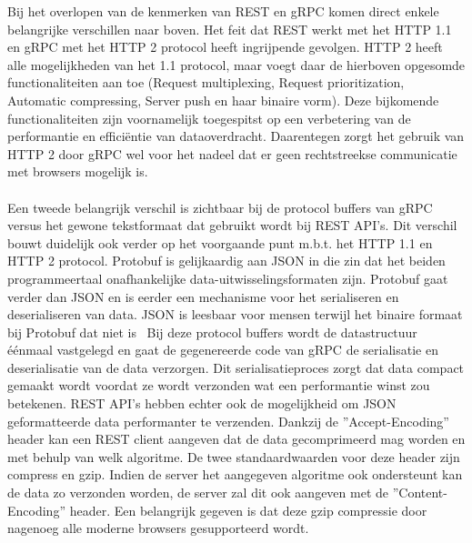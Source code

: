 Bij het overlopen van de kenmerken van REST en gRPC komen direct enkele belangrijke verschillen naar boven.
Het feit dat REST werkt met het HTTP 1.1 en gRPC met het HTTP 2 protocol heeft ingrijpende gevolgen. HTTP 2 heeft alle mogelijkheden van het 1.1 protocol,
maar voegt daar de hierboven opgesomde functionaliteiten aan toe (Request multiplexing, Request prioritization, Automatic compressing,
Server push en haar binaire vorm). Deze bijkomende functionaliteiten zijn voornamelijk toegespitst op een verbetering van de performantie en effici\"entie van dataoverdracht.
Daarentegen zorgt het gebruik van HTTP 2 door gRPC wel voor het nadeel dat er geen rechtstreekse communicatie met browsers mogelijk is.\newline
~\autocite{cloudflare}\\
~\autocite{tutsplus}\\

Een tweede belangrijk verschil is zichtbaar bij de protocol buffers van gRPC versus het gewone tekstformaat dat gebruikt wordt bij REST API's.
Dit verschil bouwt duidelijk ook verder op het voorgaande punt m.b.t. het HTTP 1.1 en HTTP 2 protocol.
Protobuf is gelijkaardig aan JSON in die zin dat het beiden programmeertaal onafhankelijke data-uitwisselingsformaten zijn.
Protobuf gaat verder dan JSON en is eerder een mechanisme voor het serialiseren en deserialiseren van data.
JSON is leesbaar voor mensen terwijl het binaire formaat bij Protobuf dat niet is~\parencite{json}
Bij deze protocol buffers wordt de datastructuur \'e\'enmaal vastgelegd en gaat de gegenereerde code van gRPC de serialisatie en deserialisatie van de data verzorgen.
Dit serialisatieproces zorgt dat data compact gemaakt wordt voordat ze wordt verzonden wat een performantie winst zou betekenen.\newline
REST API's hebben echter ook de mogelijkheid om JSON geformatteerde data performanter te verzenden. Dankzij de ''Accept-Encoding'' header kan een REST client aangeven
dat de data gecomprimeerd mag worden en met behulp van welk algoritme. De twee standaardwaarden voor deze header zijn compress en gzip. Indien de server het aangegeven algoritme
ook ondersteunt kan de data zo verzonden worden, de server zal dit ook aangeven met de ''Content-Encoding'' header. Een belangrijk gegeven is dat deze gzip compressie door
nagenoeg alle moderne browsers gesupporteerd wordt.
~\autocite{googleprotobufguide}\\
~\autocite{restcompression}\\
~\autocite{gzipBrowerSupport}\\

